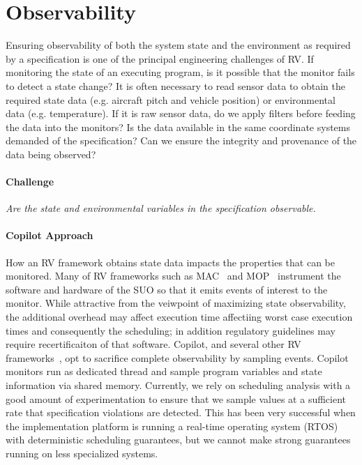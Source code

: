 \section{Observability}\label{sec:observ} 

 Ensuring observability of
both the system state and the environment as required by a
specification is one of the principal engineering challenges of RV.
If monitoring the state of an executing program, is it possible that
the monitor fails to detect a state change?  It is often necessary to
read sensor data to obtain the required state data (e.g. aircraft
pitch and vehicle position) or environmental data (e.g. temperature).
If it is raw sensor data, do we apply filters before feeding the data
into the monitors?  Is the data available in the same coordinate
systems demanded of the specification?  Can we ensure the integrity
and provenance of the data being observed?

\paragraph{Challenge} \emph{Are the state and environmental variables in the
specification  observable.}  


 
  \paragraph{Copilot Approach} 
  How an RV framework obtains state data impacts the properties that
  can be monitored.  Many of RV frameworks such as MAC~\cite{KimLKS04}
  and MOP~\cite{ChenR05} instrument the software and hardware of the
  SUO so that it emits events of interest to the monitor.  While
  attractive from the veiwpoint of maximizing state observability, the
  additional overhead may affect execution time affectiing worst case
  execution times and consequently the scheduling; in addition
  regulatory guidelines may require recertificaiton of that software.
  Copilot, and several other RV
  frameworks~\cite{sampling,Kane15,borzoo}, opt to sacrifice complete
  observability by sampling events.  Copilot monitors run as dedicated
  thread and sample program variables and state information via shared
  memory.  Currently, we rely on scheduling analysis with a good
  amount of experimentation to ensure that we sample values at a
  sufficient rate that specification violations are detected. This has
  been very successful when the implementation platform is running a
  real-time operating system (RTOS) with deterministic scheduling
  guarantees, but we cannot make strong guarantees running on less
  specialized systems.

